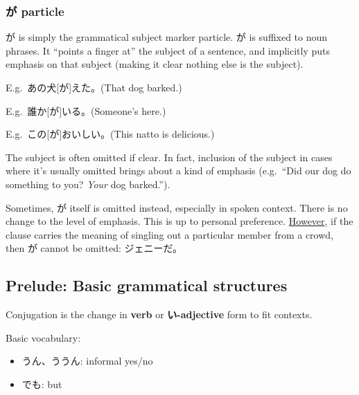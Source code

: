 \documentclass[../nihongo-gakushuu-kyouzai.tex]{subfiles}
\begin{document}
\subsubsection{が particle}
が is simply the grammatical subject marker particle. が is suffixed to noun phrases. It ``points a finger at'' the subject of a sentence, and implicitly puts emphasis on that subject (making it clear nothing else is the subject).

E.g.\ あの犬[が]えた。(That dog barked.)

E.g.\ 誰か[が]いる。(Someone's here.)

E.g.\ この[が]おいしい。(This natto is delicious.)


The subject is often omitted if clear. In fact, inclusion of the subject in cases where it's usually omitted brings about a kind of emphasis (e.g.\ ``Did our dog do something to you? \emph{Your} dog barked.'').

Sometimes, が itself is omitted instead, especially in spoken context. There is no change to the level of emphasis. This is up to personal preference. \ul{However}, if the clause carries the meaning of singling out a particular member from a crowd, then が cannot be omitted: ジェニーだ。


\subsection{Prelude: Basic grammatical structures}
Conjugation is the change in \textbf{verb} or \textbf{い-adjective} form to fit contexts.

Basic vocabulary:
\begin{itemize}
    \item うん、ううん: informal yes/no
    \item でも: but
\end{itemize}
\end{document}
